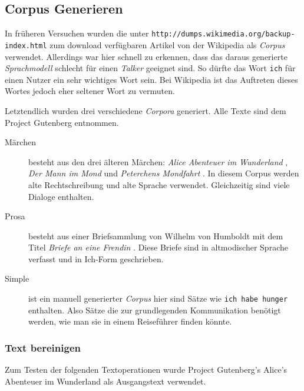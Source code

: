 \subsection{Corpus Generieren}
    In früheren Versuchen wurden die unter \texttt{http://dumps.wikimedia.org/backup-index.html} zum download verfügbaren Artikel von der Wikipedia als \emph{Corpus} verwendet. Allerdings war hier schnell zu erkennen, dass das daraus generierte \emph{Sprachmodell} schlecht für einen \emph{Talker} geeignet sind. So dürfte das Wort \texttt{ich} für einen Nutzer ein sehr wichtiges Wort sein. Bei Wikipedia ist das Auftreten dieses Wortes jedoch eher seltener Wort zu vermuten.
    
    Letztendlich wurden drei verschiedene \emph{Corpora} generiert.
    Alle Texte sind dem Project Gutenberg entnommen.
    
    \begin{description}
		\item[Märchen] besteht aus den drei älteren Märchen: \emph{Alice Abenteuer im Wunderland} \parencite{gutenberg:alice}, \emph{Der Mann im Mond} \parencite{gutenberg:mannImMond} und \emph{Peterchens Mondfahrt} \parencite{gutenberg:mondfahrt}. In diesem Corpus werden alte Rechtschreibung und alte Sprache verwendet. Gleichzeitig sind viele Dialoge enthalten.
        
        \item[Prosa] besteht aus einer Briefsammlung von Wilhelm von Humboldt mit dem Titel \emph{Briefe an eine Frendin} \parencite{gutenberg:briefeFreundin}. Diese Briefe sind in altmodischer Sprache verfasst und in Ich-Form geschrieben.
        
        \item[Simple] ist ein manuell generierter \emph{Corpus} hier sind Sätze wie \texttt{ich habe hunger} enthalten. Also Sätze die zur grundlegenden Kommunikation benötigt werden, wie man sie in einem Reiseführer finden könnte.
            
	\end{description}
        
    \subsubsection*{Text bereinigen}
    \label{clean-up-text}
    
        Zum Testen der folgenden Textoperationen wurde Project Gutenberg's Alice's Abenteuer im Wunderland \parencite{gutenberg:alice} als Ausgangstext verwendet.
        
